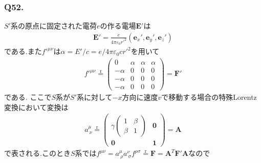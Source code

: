 \documentclass[uplatex,a4j,11pt,dvipdfmx]{jsarticle}
\begin{document}
\subsubsection*{Q52.}
$S'$系の原点に固定された電荷$e$の作る電場$\bm E'$は
\begin{align}
  {\bm E}'=\frac{e}{4\pi\varepsilon_0r'^2}({\bm e}_x',{\bm e}_y',{\bm e}_z')
\end{align}
である.また$f'^{\mu\nu}$は$\alpha=E'/c={e}/{4\pi\varepsilon_0cr'^2}$を用いて
\begin{align}
  f'^{\mu\nu}\overset{\text{r}}{=}\left(\begin{array}{cccc}
    0&\alpha&\alpha&\alpha\\
    -\alpha&0&0&0\\
    -\alpha&0&0&0\\
    -\alpha&0&0&0
  \end{array}\right)={\bm F}'
\end{align}
である.
ここで$S$系が$S'$系に対して$-x$方向に速度$v$で移動する場合の特殊Lorentz変換において変換は
\begin{align}
  a^\mu_{\ \nu}\overset{\text{r}}{=}\left(\begin{array}{cc}
    \gamma\left(\begin{array}{cc}
      1&\beta\\
      \beta&1
    \end{array}\right)&{\bm 0}\\
    {\bm 0}&{\bm 1}
  \end{array}\right)={\bm A}
\end{align}
で表される.このとき$S$系では$f^{\mu\nu}=a^\mu_{\ \rho}a^\nu_{\ \sigma}f^{\rho\sigma}\overset{\text{r}}{=}{\bm F}={\bm A}^T{\bm F}'{\bm A}$なので
\end{document}
